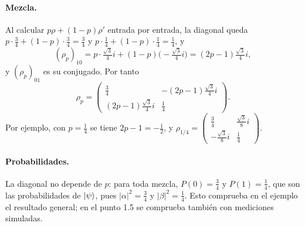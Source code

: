 \paragraph{Mezcla.} Al calcular $p\rho+(1-p)\rho'$ entrada por entrada, la diagonal queda
$p\cdot\frac34+(1-p)\cdot\frac34=\frac34$ y $p\cdot\frac14+(1-p)\cdot\frac14=\frac14$, y
\[
  (\rho_p)_{10}=p\cdot\tfrac{\sqrt3}{4}i+(1-p)\bigl(-\tfrac{\sqrt3}{4}i\bigr)=(2p-1)\tfrac{\sqrt3}{4}i ,
\]
y $(\rho_p)_{01}$ es su conjugado. Por tanto
\[
  \rho_p=\begin{pmatrix}\frac34 & -(2p-1)\frac{\sqrt3}{4}i\\[3pt]
                        (2p-1)\frac{\sqrt3}{4}i & \frac14\end{pmatrix}.
\]
Por ejemplo, con $p=\frac14$ se tiene $2p-1=-\frac12$, y
$\rho_{1/4}=\begin{pmatrix}\frac34 & \frac{\sqrt3}{8}i\\[2pt] -\frac{\sqrt3}{8}i & \frac14\end{pmatrix}$.

\paragraph{Probabilidades.} La diagonal no depende de $p$: para toda mezcla, $P(0)=\frac34$ y
$P(1)=\frac14$, que son las probabilidades de $\lvert \psi\rangle$, pues $|\alpha|^2=\frac34$ y
$|\beta|^2=\frac14$. Esto comprueba en el ejemplo el resultado general; en el punto 1.5 se
comprueba también con mediciones simuladas.

